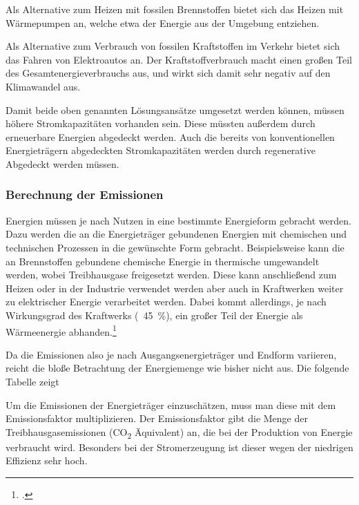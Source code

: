 \documentclass[12pt, ngerman]{article}
\begin{document}
Als Alternative zum Heizen mit fossilen Brennstoffen bietet sich
das Heizen mit Wärmepumpen an, welche etwa \unit{} der
Energie aus der Umgebung entziehen.

Als Alternative zum Verbrauch von fossilen Kraftstoffen im Verkehr bietet
sich das Fahren von Elektroautos an. Der Kraftstoffverbrauch macht einen
großen Teil des Gesamtenergieverbrauchs aus, und wirkt sich damit sehr
negativ auf den Klimawandel aus.

Damit beide oben genannten Lösungsansätze umgesetzt werden können, müssen
höhere Stromkapazitäten vorhanden sein. Diese müssten außerdem durch erneuerbare
Energien abgedeckt werden. Auch die bereits von konventionellen Energieträgern
abgedeckten Stromkapazitäten werden durch regenerative Abgedeckt werden müssen.

\subsubsection{Berechnung der Emissionen}

Energien müssen je nach Nutzen in eine bestimmte Energieform gebracht werden.
Dazu werden die an die Energieträger gebundenen Energien mit chemischen und technischen
Prozessen in die gewünschte Form gebracht.
Beispielsweise kann die an Brennstoffen gebundene chemische Energie
in thermische umgewandelt werden, wobei Treibhausgase freigesetzt werden.
Diese kann anschließend zum Heizen oder in der Industrie verwendet werden
aber auch in Kraftwerken weiter zu elektrischer Energie verarbeitet werden.
Dabei kommt allerdings, je nach Wirkungsgrad des Kraftwerks (~\qty{45}{\%}), 
ein großer Teil der Energie als Wärmeenergie abhanden.\footcite{AachenHatEnergie}

Da die Emissionen also je nach Ausgangsenergieträger und Endform variieren,
reicht die bloße Betrachtung der Energiemenge wie bisher nicht aus.
Die folgende Tabelle zeigt 


Um die Emissionen der Energieträger einzuschätzen, muss man diese mit dem Emissionsfaktor multiplizieren.
Der Emissionsfaktor gibt die Menge der Treibhausgasemissionen (CO\textsubscript{2} Äquivalent) an,
die bei der Produktion von Energie verbraucht wird.
Besonders bei der Stromerzeugung ist dieser wegen der niedrigen Effizienz sehr hoch.
\end{document}
